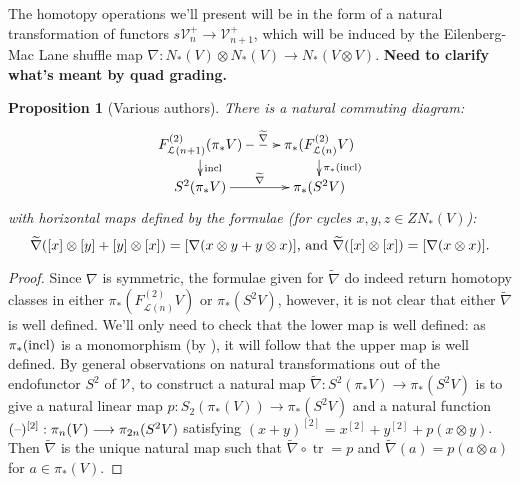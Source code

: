 \documentclass[11pt]{amsart}
\theoremstyle{plain}
\newtheorem{prop}[thm]{Proposition}
\theoremstyle{definition}
\DeclareMathOperator{\trace}{tr}
\newcommand{\DASH}{\textup{--}}
\renewcommand{\to}{\longrightarrow}
\newcommand{\calL}{\mathcal{L}}
\newcommand{\calV}{\mathcal{V}}
\theoremstyle{plain}
\newcommand{\restn}[1]{#1^{[2]}}
\newcommand{\vect}[2]{\calV^{#1}_{#2}}
\begin{document}
\begin{Lie algebras in characteristic 2 and their homotopy operations}
The homotopy operations we'll present will be in the form of a natural transformation of functors $s\vect{+}{n}\to \vect{+}{n+1}$, which will be induced by the Eilenberg-Mac Lane shuffle map $\nabla:N_*(V)\otimes N_*(V)\to N_*(V\otimes V)$. \textbf{Need to clarify what's meant by quad grading.}
\begin{prop}[Various authors]\label{the top homotopy operations for Lie algebras}
There is a natural commuting diagram:
\[\xymatrix@R=4mm{
F^{(2)}_{\calL(n+1)}(\pi_*V)\ar@{-->}[r]^-{\widetilde{\nabla}}
\ar[d]^-{\textup{incl}}
&%
\pi_*(F^{(2)}_{\calL(n)}V)\ar[d]^-{\pi_*(\textup{incl})}
\\%
S^2(\pi_*V)\ar[r]^-{\widetilde{\nabla}}&%
\pi_*(S^2V)%
}\]
with horizontal maps defined by the formulae (for cycles $x,y,z\in ZN_*(V)$):
\[\widetilde{\nabla}([x]\otimes[y]+[y]\otimes [x])=[\nabla(x\otimes y+y\otimes x)]\textup{, and }\widetilde{\nabla}([x]\otimes[x])=[\nabla(x\otimes x)].\]
\end{prop}
\begin{proof}
Since $\nabla$ is symmetric, the formulae given for $\widetilde{\nabla}$ do indeed return homotopy classes in either $\pi_*(F^{(2)}_{\calL(n)}V)$ or $\pi_*(S^2V)$, however, it is not clear that either $\widetilde{\nabla}$ is well defined. We'll only need to check that the lower map is well defined: as $\pi_*(\textup{incl})$ is a monomorphism (by \cite[Prop 5.6]{BousOpnsDerFun.pdf}), it will follow that the upper map is well defined. 
By general observations on natural transformations out of the endofunctor $S^2$ of $\vect{}{}$, to construct a natural map $\widetilde{\nabla}:S^2(\pi_*V)\to\pi_*(S^2V)$ is to give a natural linear map $p:S_2(\pi_*(V))\to \pi_*(S^2V)$ and a natural function $\restn{(\DASH)}:\pi_n(V)\to \pi_{2n}(S^2V)$ satisfying $\restn{(x+y)}=\restn{x}+\restn{y}+p(x\otimes y)$. Then $\widetilde{\nabla}$ is the unique natural map such that $\widetilde{\nabla}\circ\trace=p$ and $\widetilde{\nabla}(a)=p(a\otimes a)$ for $a\in\pi_*\left(V\right)$.

\end{proof}
\end{Lie algebras in characteristic 2 and their homotopy operations}
\end{document}
